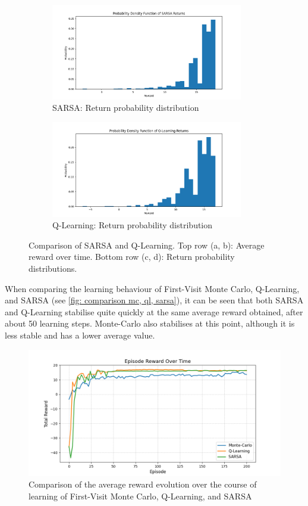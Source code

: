 \documentclass{class}
\begin{document}
\begin{figure}[H]
    \begin{subfigure}[t]{0.47\linewidth}
        \centering
        \includegraphics[height=4.2cm]{../plots/return_probability/sarsa_return_probability.png}
        \caption{SARSA: Return probability distribution}
        \label{fig:sarsa_return_probability}
    \end{subfigure}
    \hspace{0.03\linewidth}
    \begin{subfigure}[t]{0.47\linewidth}
        \centering
        \includegraphics[height=4.2cm]{../plots/return_probability/q_learning_return_probability.png}
        \caption{Q-Learning: Return probability distribution}
        \label{fig:qlearning_return_probability}
    \end{subfigure}

    \caption{Comparison of SARSA and Q-Learning. Top row (a, b): Average reward over time. Bottom row (c, d): Return probability distributions.}
    \label{fig:sarsa_qlearning_comparison}
\end{figure}

\noindent When comparing the learning behaviour of First-Visit Monte Carlo, Q-Learning, and SARSA (see \autoref{fig: comparison mc, ql, sarsa}), it can be seen that both SARSA and Q-Learning stabilise quite quickly at the same average reward obtained, after about 50 learning steps. Monte-Carlo also stabilises at this point, although it is less stable and has a lower average value. 

\begin{figure}[H]
    \centering
    \includegraphics[width=0.7\linewidth]{../plots/comparison/comparison_plot_final.png}
    \caption{Comparison of the average reward evolution over the course of learning of First-Visit Monte Carlo, Q-Learning, and SARSA}
    \label{fig: comparison mc, ql, sarsa}
\end{figure}
\end{document}
